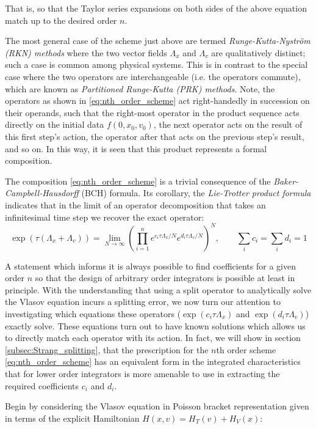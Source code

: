 \documentclass[11pt,titlepage]{report}
\begin{document}
\noindent That is, so that the Taylor series expansions on both sides of the above equation match up to the desired order $n$.

The most general case of the scheme just above are termed \emph{Runge-Kutta-Nystr\"{o}m (RKN) methods} where the two vector fields $\Lambda_x$ and $\Lambda_v$ are qualitatively distinct; such a case is common among physical systems. This is in contrast to the special case where the two operators are interchangeable (i.e. the operators commute), which are known as \emph{Partitioned Runge-Kutta (PRK) methods}. Note, the operators as shown in \eqref{eq:nth_order_scheme} act right-handedly in succession on their operands, such that the right-most operator in the product sequence acts directly on the initial data $f(0,x_0,v_0)$, the next operator acts on the result of this first step's action, the operator after that acts on the previous step's result, and so on. In this way, it is seen that this product represents a formal composition.

The composition \eqref{eq:nth_order_scheme} is a trivial consequence of the \emph{Baker-Campbell-Hausdorff} (BCH) formula. Its corollary, the \emph{Lie-Trotter product formula} indicates that in the limit of an operator decomposition that takes an infinitesimal time step  we recover the exact operator:
 $$\exp (\tau (\Lambda_x+\Lambda_v)) = \lim_{N\rightarrow\infty}\left(\prod_{i=1}^ne^{c_i\tau\Lambda_x/N}e^{d_i\tau\Lambda_v/N}\right)^N, \qquad \sum_i c_i =  \sum_i d_i = 1$$

\noindent A statement which informs it is always possible to find coefficients for a given order $n$ so that the design of arbitrary order integrators is possible at least in principle. With the understanding that using a split operator to analytically solve the Vlasov equation incurs a splitting error,  we now turn our attention to investigating which equations these operators ($\exp (c_i\tau\Lambda_x)$ and $\exp (d_i\tau\Lambda_v)$) exactly solve. These equations turn out to have known solutions which allows us to directly match each operator with its action. In fact, we will show in section \ref{subsec:Strang_splitting}, that the prescription for the $n$th order scheme \eqref{eq:nth_order_scheme} has an equivalent form in the integrated characteristics that for lower order integrators is more amenable to use in extracting the required coefficients $c_i$ and $d_i$.

Begin by considering the Vlasov equation in Poisson bracket representation given in terms of the explicit Hamiltonian $H(x,v) = H_T(v) + H_V(x)$:
\end{document}
